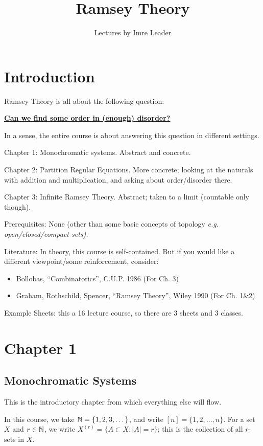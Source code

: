 \documentclass[10pt]{article}
\title{Ramsey Theory}
\author{Lectures by Imre Leader}
\date{}
\begin{document}
\maketitle
\section{Introduction}
Ramsey Theory is all about the following question:

\begin{center}
    \underline{\textbf{Can we find some order in (enough) disorder?}}    
\end{center}

In a sense, the entire course is about answering this question in different settings.

Chapter 1: Monochromatic systems. Abstract and concrete.

Chapter 2: Partition Regular Equations. More concrete; looking at the naturals with addition and multiplication, and asking about order/disorder there.

Chapter 3: Infinite Ramsey Theory. Abstract; taken to a limit (countable only though).

Prerequisites: None (other than some basic concepts of topology \it{e.g.} open/closed/compact sets).

Literature: In theory, this course is self-contained. But if you would like a different viewpoint/some reinforcement, consider:
\begin{itemize}
    \item Bollobas, ``Combinatorics'', C.U.P. 1986 (For Ch. 3)
    \item Graham, Rothschild, Spencer, ``Ramsey Theory'', Wiley 1990 (For Ch. 1\&2)
\end{itemize}

Example Sheets: this a 16 lecture course, so there are 3 sheets and 3 classes.

\clearpage
\section{Chapter 1}
\subsection{Monochromatic Systems}

This is the introductory chapter from which everything else will flow.

In this course, we take $\mathbb{N} = \{1,2,3,\dots\}$, and write $[n] = \{1,2,\dots,n\}$. For a set $X$ and $r\in \mathbb{N}$, we write $X^{(r)} = \{A\subset X : |A| = r\}$; this is the collection of all $r$-sets in $X$.
\end{document}
